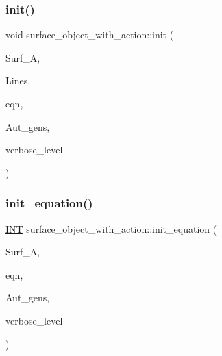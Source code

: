 \mbox{\label{classsurface__object__with__action_ad282ab47ac9623de9053b626c87ef44d}} 
\subsubsection{\texorpdfstring{init()}{init()}}
{\footnotesize\ttfamily void surface\+\_\+object\+\_\+with\+\_\+action\+::init (\begin{DoxyParamCaption}\item[{\mbox{\hyperlink{classsurface__with__action}{surface\+\_\+with\+\_\+action}} $\ast$}]{Surf\+\_\+A,  }\item[{\mbox{\hyperlink{galois_8h_a09fddde158a3a20bd2dcadb609de11dc}{I\+NT}} $\ast$}]{Lines,  }\item[{\mbox{\hyperlink{galois_8h_a09fddde158a3a20bd2dcadb609de11dc}{I\+NT}} $\ast$}]{eqn,  }\item[{\mbox{\hyperlink{classstrong__generators}{strong\+\_\+generators}} $\ast$}]{Aut\+\_\+gens,  }\item[{\mbox{\hyperlink{galois_8h_a09fddde158a3a20bd2dcadb609de11dc}{I\+NT}}}]{verbose\+\_\+level }\end{DoxyParamCaption})}

\mbox{\label{classsurface__object__with__action_a310ce4189e50545dd67fa3652b8fd160}} 
\subsubsection{\texorpdfstring{init\+\_\+equation()}{init\_equation()}}
{\footnotesize\ttfamily \mbox{\hyperlink{galois_8h_a09fddde158a3a20bd2dcadb609de11dc}{I\+NT}} surface\+\_\+object\+\_\+with\+\_\+action\+::init\+\_\+equation (\begin{DoxyParamCaption}\item[{\mbox{\hyperlink{classsurface__with__action}{surface\+\_\+with\+\_\+action}} $\ast$}]{Surf\+\_\+A,  }\item[{\mbox{\hyperlink{galois_8h_a09fddde158a3a20bd2dcadb609de11dc}{I\+NT}} $\ast$}]{eqn,  }\item[{\mbox{\hyperlink{classstrong__generators}{strong\+\_\+generators}} $\ast$}]{Aut\+\_\+gens,  }\item[{\mbox{\hyperlink{galois_8h_a09fddde158a3a20bd2dcadb609de11dc}{I\+NT}}}]{verbose\+\_\+level }\end{DoxyParamCaption})}

